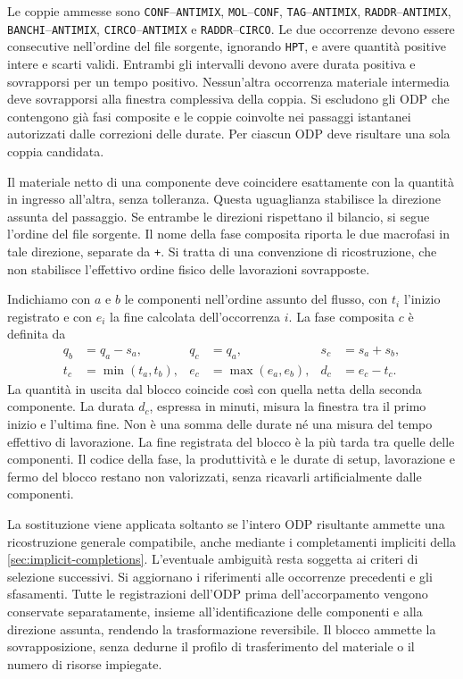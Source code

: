 Le coppie ammesse sono \texttt{CONF}--\texttt{ANTIMIX}, \texttt{MOL}--\texttt{CONF}, \texttt{TAG}--\texttt{ANTIMIX}, \texttt{RADDR}--\texttt{ANTIMIX}, \texttt{BANCHI}--\texttt{ANTIMIX}, \texttt{CIRCO}--\texttt{ANTIMIX} e \texttt{RADDR}--\texttt{CIRCO}. Le due occorrenze devono essere consecutive nell'ordine del file sorgente, ignorando \texttt{HPT}, e avere quantità positive intere e scarti validi. Entrambi gli intervalli devono avere durata positiva e sovrapporsi per un tempo positivo. Nessun'altra occorrenza materiale intermedia deve sovrapporsi alla finestra complessiva della coppia. Si escludono gli ODP che contengono già fasi composite e le coppie coinvolte nei passaggi istantanei autorizzati dalle correzioni delle durate. Per ciascun ODP deve risultare una sola coppia candidata.

Il materiale netto di una componente deve coincidere esattamente con la quantità in ingresso all'altra, senza tolleranza. Questa uguaglianza stabilisce la direzione assunta del passaggio. Se entrambe le direzioni rispettano il bilancio, si segue l'ordine del file sorgente. Il nome della fase composita riporta le due macrofasi in tale direzione, separate da \texttt{+}. Si tratta di una convenzione di ricostruzione, che non stabilisce l'effettivo ordine fisico delle lavorazioni sovrapposte.

Indichiamo con $a$ e $b$ le componenti nell'ordine assunto del flusso, con $t_i$ l'inizio registrato e con $e_i$ la fine calcolata dell'occorrenza $i$. La fase composita $c$ è definita da
\begin{equation}
\label{eq:composite-phase-definition}
\begin{aligned}
q_b&=q_a-s_a, & q_c&=q_a, & s_c&=s_a+s_b,\\
t_c&=\min(t_a,t_b), & e_c&=\max(e_a,e_b), & d_c&=e_c-t_c.
\end{aligned}
\end{equation}
La quantità in uscita dal blocco coincide così con quella netta della seconda componente. La durata $d_c$, espressa in minuti, misura la finestra tra il primo inizio e l'ultima fine. Non è una somma delle durate né una misura del tempo effettivo di lavorazione. La fine registrata del blocco è la più tarda tra quelle delle componenti. Il codice della fase, la produttività e le durate di setup, lavorazione e fermo del blocco restano non valorizzati, senza ricavarli artificialmente dalle componenti.

La sostituzione viene applicata soltanto se l'intero ODP risultante ammette una ricostruzione generale compatibile, anche mediante i completamenti impliciti della \cref{sec:implicit-completions}. L'eventuale ambiguità resta soggetta ai criteri di selezione successivi. Si aggiornano i riferimenti alle occorrenze precedenti e gli sfasamenti. Tutte le registrazioni dell'ODP prima dell'accorpamento vengono conservate separatamente, insieme all'identificazione delle componenti e alla direzione assunta, rendendo la trasformazione reversibile. Il blocco ammette la sovrapposizione, senza dedurne il profilo di trasferimento del materiale o il numero di risorse impiegate.

